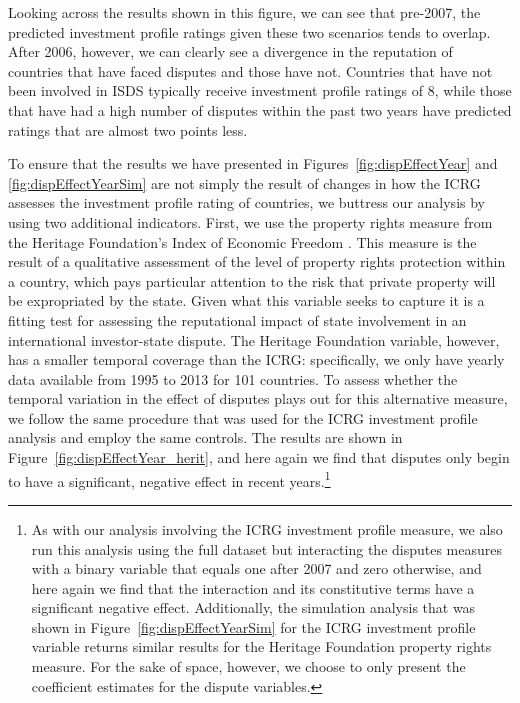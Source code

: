 \documentclass[12pt,onesided]{amsart}
\begin{document}
Looking across the results shown in this figure, we can see that pre-2007, the predicted investment profile ratings given these two scenarios tends to overlap. After 2006, however, we can clearly see a divergence in the reputation of countries that have faced disputes and those have not. Countries that have not been involved in ISDS typically receive investment profile ratings of 8, while those that have had a high number of disputes within the past two years have predicted ratings that are almost two points less. 

To ensure that the results we have presented in Figures~\ref{fig:dispEffectYear} and \ref{fig:dispEffectYearSim} are not simply the result of changes in how the ICRG assesses the investment profile rating of countries, we buttress our analysis by using two additional indicators. First, we use the property rights measure from the Heritage Foundation's Index of Economic Freedom \citep{miles:etal:2004}. This measure is the result of a qualitative assessment of the level of property rights protection within a country, which pays particular attention to the risk that private property will be expropriated by the state. Given what this variable seeks to capture it is a fitting test for assessing the reputational impact of state involvement in an international investor-state dispute. The Heritage Foundation variable, however, has a smaller temporal coverage than the ICRG: specifically, we only have yearly data available from 1995 to 2013 for 101 countries. To assess whether the temporal variation in the effect of disputes plays out for this alternative measure, we follow the same procedure that was used for the ICRG investment profile analysis and employ the same controls. The results are shown in Figure~\ref{fig:dispEffectYear_herit}, and here again we find that disputes only begin to have a significant, negative effect in recent years.\footnote{As with our analysis involving the ICRG investment profile measure, we also run this analysis using the full dataset but interacting the disputes measures with a binary variable that equals one after 2007 and zero otherwise, and here again we find that the interaction and its constitutive terms have a significant negative effect. Additionally, the simulation analysis that was shown in Figure~\ref{fig:dispEffectYearSim} for the ICRG investment profile variable returns similar results for the Heritage Foundation property rights measure. For the sake of space, however, we choose to only present the coefficient estimates for the dispute variables.} 
\end{document}
